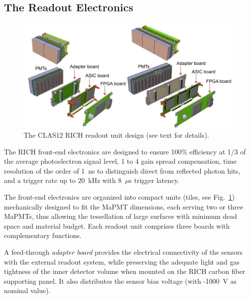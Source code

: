 \documentclass[5p,times,twocolumn]{elsarticle}
\begin{document}
\subsection{The Readout Electronics}

\begin{figure}[t]
\begin{center}
\includegraphics[width=1.00\columnwidth]{TileAssembly.pdf}
\end{center}
\caption{The CLAS12 RICH readout unit design (see text for details).}
\label{fig:EleTile}
\end{figure}

The RICH front-end electronics are designed to ensure 100\% efficiency at 1/3 of the average photoelectron signal
level, 1 to 4 gain spread compensation, time resolution of the order of 1~ns to distinguish direct from reflected photon
hits, and a trigger rate up to 20~kHz with 8~$\mu$s trigger latency.

The front-end electronics are organized into compact units (tiles, see Fig.~\ref{fig:EleTile}) mechanically designed to
fit the MaPMT dimensions, each serving two or three MaPMTs, thus allowing the tessellation of large surfaces with
minimum dead space and material budget. Each readout unit comprises three boards with complementary functions.

A feed-through {\it adapter board} provides the electrical connectivity of the sensors with the external readout
system, while preserving the adequate light and gas tightness of the inner detector volume when mounted on the RICH
carbon fiber supporting panel. It also distributes the sensor bias voltage (with -1000~V as nominal value).
\end{document}
